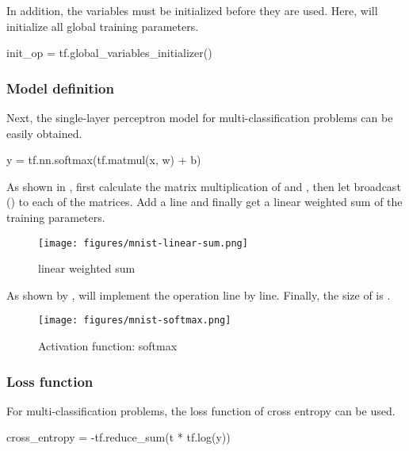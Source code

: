 \begin{content}
\begin{content}
In addition, the variables must be initialized before they are used. Here,  will initialize all global training parameters.

\begin{leftbar}
\begin{python}
init_op = tf.global_variables_initializer()
\end{python}
\end{leftbar}


\subsubsection{Model definition}
Next, the single-layer perceptron model for multi-classification problems can be easily obtained.

\begin{leftbar}
\begin{python}
y = tf.nn.softmax(tf.matmul(x, w) + b)
\end{python}
\end{leftbar}

As shown in , first calculate the matrix multiplication of  and , then let  broadcast () to each of the matrices. Add a line and finally get a linear weighted sum of the training parameters.

\begin{figure}[H]
  \centering
  \texttt{[image: figures/mnist-linear-sum.png]}
  \caption{linear weighted sum}
  \label{fig:mnist-linear-sum}
\end{figure}

As shown by ,  will implement the operation line by line. Finally, the size of  is \code{[100, 10]}.

\begin{figure}[H]
  \centering
  \texttt{[image: figures/mnist-softmax.png]}
  \caption{Activation function: softmax}
  \label{fig:mnist-softmax}
\end{figure}


\subsubsection{Loss function}
For multi-classification problems, the loss function of cross entropy can be used.

\begin{leftbar}
\begin{python}
cross_entropy = -tf.reduce_sum(t * tf.log(y))
\end{python}
\end{leftbar}


\end{content}
\end{content}
